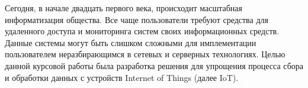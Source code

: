 Сегодня, в начале двадцать первого века, происходит масштабная информатизация общества.
Все чаще пользователи требуют средства для удаленного доступа и мониторинга систем своих 
информационных средств. Данные системы могут быть слишком сложными для имплементации
пользователем неразбирающимся в сетевых и серверных технологиях.
Целью данной курсовой работы была разработка решения для упрощения 
процесса сбора и обработки данных с устройств Internet of Things (далее IoT). 